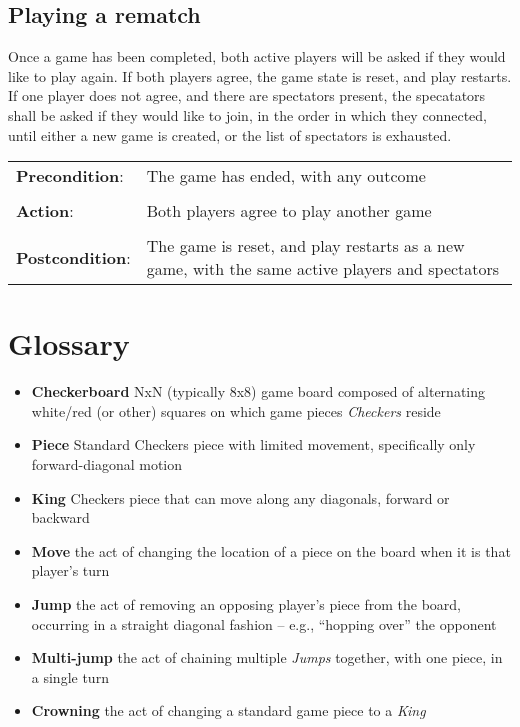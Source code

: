 \documentclass[letterpaper]{article}
\newcommand{\prepost}[3]
{
    \begin{tabulary}{\linewidth}{p{2.5cm}p{7.5cm}}
    \textbf{Precondition}:  & #1\\\\
    \textbf{Action}:        & #2\\\\
    \textbf{Postcondition}: & #3\\
    \end{tabulary}
}
\begin{document}
\subsection{Playing a rematch}
\label{sec:usecases_rematch}

Once a game has been completed, both active players will be
asked if they would like to play again. If both players agree,
the game state is reset, and play restarts. If one player does
not agree, and there are spectators present, the specatators
shall be asked if they would like to join, in the order in which
they connected, until either a new game is created, or the list
of spectators is exhausted.\\

\prepost
{The game has ended, with any outcome}
{Both players agree to play another game}
{The game is reset, and play restarts as a new game, with the
same active players and spectators}


\newpage

\section{Glossary}
\label{sec:glossary}

\begin{itemize}
    \item \textbf{Checkerboard} NxN (typically 8x8) game board
          composed of alternating white/red (or other) squares
          on which game pieces \emph{Checkers} reside
    \item \textbf{Piece} Standard Checkers piece with limited
          movement, specifically only forward-diagonal motion
    \item \textbf{King} Checkers piece that can move along any
          diagonals, forward or backward
    \item \textbf{Move} the act of changing the location of a
          piece on the board when it is that player's turn
    \item \textbf{Jump} the act of removing an opposing player's
          piece from the board, occurring in a straight diagonal
          fashion -- e.g., ``hopping over'' the opponent
    \item \textbf{Multi-jump} the act of chaining multiple 
          \emph{Jumps} together, with one piece, in a single
          turn
    \item \textbf{Crowning} the act of changing a standard game
          piece to a \emph{King}
\end{itemize}
\end{document}
